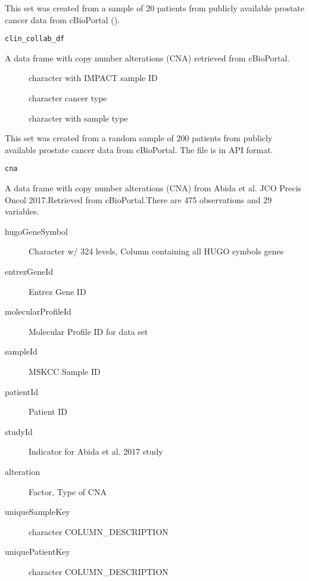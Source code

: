 \documentclass[a4paper]{book}
\begin{document}
%
\begin{Description}\relax
This set was created from a sample of 20 patients from
publicly available prostate cancer data from cBioPortal ().
\end{Description}
%
\begin{Usage}
\begin{verbatim}
clin_collab_df
\end{verbatim}
\end{Usage}
%
\begin{Format}
A data frame with copy number alterations (CNA) retrieved from cBioPortal.
\begin{description}

\item[] character with IMPACT sample ID
\item[] character cancer type
\item[] character with sample type

\end{description}

\end{Format}
%
\begin{Description}\relax
This set was created from a random sample of 200 patients from
publicly available prostate cancer data from cBioPortal. The file
is in API format.
\end{Description}
%
\begin{Usage}
\begin{verbatim}
cna
\end{verbatim}
\end{Usage}
%
\begin{Format}
A data frame with copy number alterations (CNA) from Abida et al.
JCO Precis Oncol 2017.Retrieved from cBioPortal.There are 475 observations
and 29 variables.
\begin{description}

\item[hugoGeneSymbol] Character w/ 324 levels,
Column containing all HUGO symbols genes
\item[entrezGeneId] Entrez Gene ID
\item[molecularProfileId] Molecular Profile ID for data set
\item[sampleId] MSKCC Sample ID
\item[patientId] Patient ID
\item[studyId] Indicator for Abida et al. 2017 study
\item[alteration] Factor, Type of CNA
\item[uniqueSampleKey] character COLUMN\_DESCRIPTION
\item[uniquePatientKey] character COLUMN\_DESCRIPTION
\end{description}

\end{Format}
\end{document}
